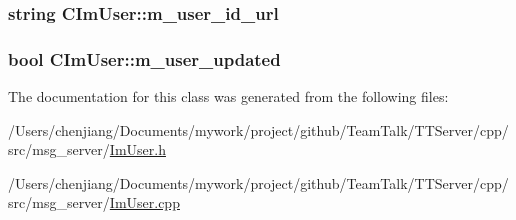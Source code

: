 \subsubsection[{m\+\_\+user\+\_\+id\+\_\+url}]{\setlength{\rightskip}{0pt plus 5cm}string C\+Im\+User\+::m\+\_\+user\+\_\+id\+\_\+url\hspace{0.3cm}{\ttfamily [private]}}\label{class_c_im_user_af4be2861d6f8d64ec714b7ac2935d851}
\hypertarget{class_c_im_user_a716381ad5f004a8f37a42338fcc72ed1}{}
\subsubsection[{m\+\_\+user\+\_\+updated}]{\setlength{\rightskip}{0pt plus 5cm}bool C\+Im\+User\+::m\+\_\+user\+\_\+updated\hspace{0.3cm}{\ttfamily [private]}}\label{class_c_im_user_a716381ad5f004a8f37a42338fcc72ed1}


The documentation for this class was generated from the following files\+:\begin{DoxyCompactItemize}
\item 
/\+Users/chenjiang/\+Documents/mywork/project/github/\+Team\+Talk/\+T\+T\+Server/cpp/src/msg\+\_\+server/\hyperlink{_im_user_8h}{Im\+User.\+h}\item 
/\+Users/chenjiang/\+Documents/mywork/project/github/\+Team\+Talk/\+T\+T\+Server/cpp/src/msg\+\_\+server/\hyperlink{_im_user_8cpp}{Im\+User.\+cpp}\end{DoxyCompactItemize}
